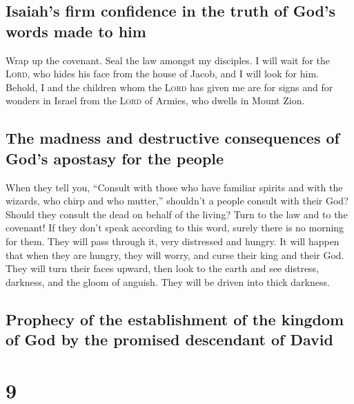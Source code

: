 \hypertarget{isaiahs-firm-confidence-in-the-truth-of-gods-words-made-to-him}{%
\subsection{Isaiah's firm confidence in the truth of God's words made to
him}\label{isaiahs-firm-confidence-in-the-truth-of-gods-words-made-to-him}}

 Wrap up the covenant. Seal the law amongst my disciples.
 I will wait for the \textsc{Lord}, who hides his face
from the house of Jacob, and I will look for him. 
Behold, I and the children whom the \textsc{Lord} has given me are for
signs and for wonders in Israel from the \textsc{Lord} of Armies, who
dwells in Mount Zion.

\hypertarget{the-madness-and-destructive-consequences-of-gods-apostasy-for-the-people}{%
\subsection{The madness and destructive consequences of God's apostasy
for the
people}\label{the-madness-and-destructive-consequences-of-gods-apostasy-for-the-people}}

 When they tell you, ``Consult with those who have
familiar spirits and with the wizards, who chirp and who mutter,''
shouldn't a people consult with their God? Should they consult the dead
on behalf of the living?  Turn to the law and to the
covenant! If they don't speak according to this word, surely there is no
morning for them.  They will pass through it, very
distressed and hungry. It will happen that when they are hungry, they
will worry, and curse their king and their God. They will turn their
faces upward,  then look to the earth and see distress,
darkness, and the gloom of anguish. They will be driven into thick
darkness.

\hypertarget{prophecy-of-the-establishment-of-the-kingdom-of-god-by-the-promised-descendant-of-david}{%
\subsection{Prophecy of the establishment of the kingdom of God by the
promised descendant of
David}\label{prophecy-of-the-establishment-of-the-kingdom-of-god-by-the-promised-descendant-of-david}}

\hypertarget{section-8}{%
\section{9}\label{section-8}}

